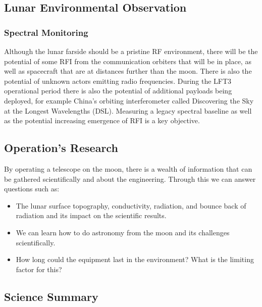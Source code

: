 \subsection{Lunar Environmental Observation}

\subsubsection{Spectral Monitoring}
Although the lunar farside should be a pristine RF environment, there will be the potential of some RFI from the communication orbiters that will be in place, as well as spacecraft that are at distances further than the moon.  There is also the potential of unknown actors emitting radio frequencies.  During the LFT3 operational period there is also the potential of additional payloads being deployed, for example China's orbiting interferometer called Discovering the Sky at the Longest Wavelengths (DSL).  Measuring a legacy spectral baseline as well as the potential increasing emergence of RFI is a key objective.


\subsection{Operation's Research}
By operating a telescope on the moon, there is a wealth of information that can be gathered scientifically and about the engineering. Through this we can answer questions such as:

\begin{itemize}
    \item The lunar surface topography, conductivity, radiation, and bounce back of radiation and its impact on the scientific results.
    \item We can learn how to do astronomy from the moon and its challenges scientifically. 
    \item How long could the equipment last in the environment? What is the limiting factor for this?
\end{itemize}

\subsection{Science Summary}
